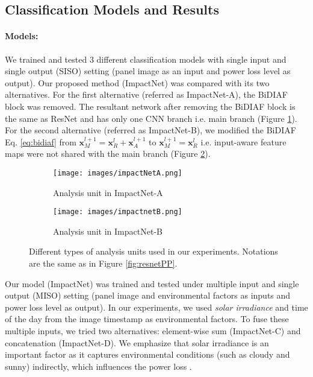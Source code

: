 \documentclass[10pt,twocolumn,letterpaper]{article}
\begin{document}
\subsection{Classification Models and Results}
\label{ssec:classRes}
\paragraph{Models:} We trained and tested 3 different classification models with single input and single output (SISO) setting (panel image as an input and power loss level as output). Our proposed method (ImpactNet) was compared with its two alternatives. For the first alternative (referred as ImpactNet-A), the BiDIAF block was removed. The resultant network after removing the BiDIAF block is the same as ResNet \cite{ResNet} and has only one CNN branch i.e. main branch (Figure \ref{fig:impactA}). For the second alternative (referred as ImpactNet-B), we modified the BiDIAF Eq. \ref{eq:bidiaf} from $\mathbf{x}_M^{l+1} = \mathbf{x}_R^{l} + \mathbf{x}_A^{l+1}$ to $\mathbf{x}_M^{l+1} = \mathbf{x}_R^{l}$ i.e. input-aware feature maps were not shared with the main branch (Figure \ref{fig:impactB}).

\begin{figure}[b!]
\centering
\begin{subfigure}[b]{\columnwidth}
\centering
\texttt{[image: images/impactNetA.png]}
\caption{Analysis unit in ImpactNet-A}
\label{fig:impactA}
\end{subfigure}
\vfill
\begin{subfigure}[b]{\columnwidth}
\centering
\texttt{[image: images/impactnetB.png]}
\setlength{\belowcaptionskip}{-6mm}
\caption{Analysis unit in ImpactNet-B}
\label{fig:impactB}
\end{subfigure}
\setlength{\belowcaptionskip}{-4mm}
\caption{Different types of analysis units used in our experiments. Notations are the same as in Figure \ref{fig:resnetPP}.}
\label{fig:impactTypes}
\end{figure}

Our model (ImpactNet) was trained and tested  under multiple input and single output (MISO) setting (panel image and environmental factors as inputs and power loss level as output). In our experiments, we used \textit{solar irradiance} and time of the day from the image timestamp as environmental factors. To fuse these multiple inputs, we tried two alternatives: element-wise sum (ImpactNet-C) and concatenation (ImpactNet-D). We emphasize that solar irradiance is an important factor as it captures environmental conditions (such as cloudy and sunny) indirectly, which influences the power loss \cite{ando2015sentinella}.
\end{document}
